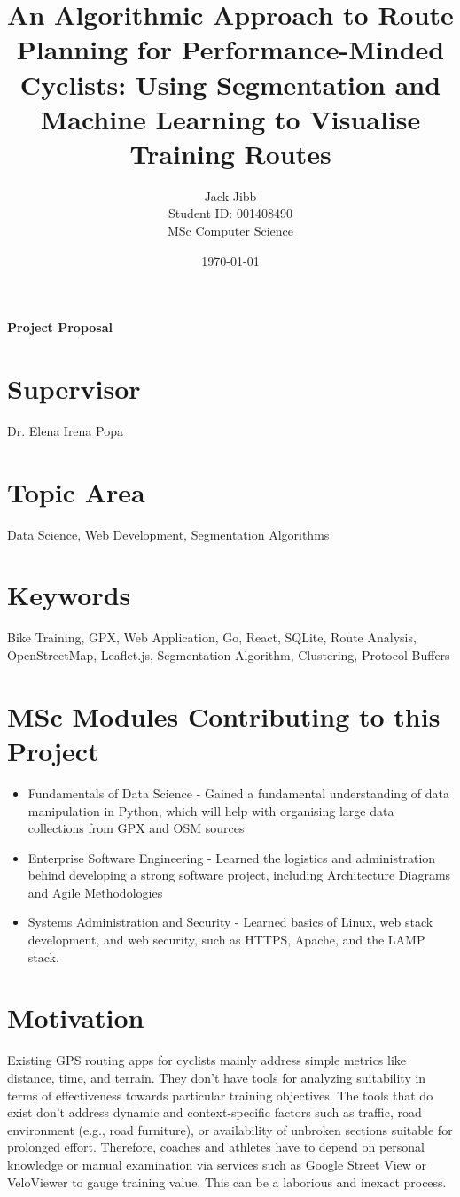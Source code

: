 \documentclass{article}
\title{An Algorithmic Approach to Route Planning for Performance-Minded Cyclists: Using Segmentation and Machine Learning to Visualise Training Routes}
\author{Jack Jibb\\ Student ID: 001408490 \\ MSc Computer Science}
\date{\today}
\begin{document}
\maketitle

\begin{center}
	\textbf{Project Proposal}
\end{center}

\section*{Supervisor}
Dr. Elena Irena Popa

\section*{Topic Area}
Data Science, Web Development, Segmentation Algorithms

\section*{Keywords}
Bike Training, GPX, Web Application, Go, React, SQLite, Route Analysis, OpenStreetMap, Leaflet.js, Segmentation Algorithm, Clustering, Protocol Buffers

\section*{MSc Modules Contributing to this Project}
\begin {itemize}
\item Fundamentals of Data Science - Gained a fundamental understanding of data manipulation in Python, which will help with organising large data collections from GPX and OSM sources
\item Enterprise Software Engineering - Learned the logistics and administration behind developing a strong software project, including Architecture Diagrams and Agile Methodologies
\item Systems Administration and Security - Learned basics of Linux, web stack development, and web security, such as HTTPS, Apache, and the LAMP stack.
\end{itemize}

\section{Motivation}
Existing GPS routing apps for cyclists mainly address simple metrics like distance, time, and terrain. They don't have tools for analyzing
suitability in terms of effectiveness towards particular training objectives. The tools that do exist don't address dynamic and context-specific factors
such as traffic, road environment (e.g., road furniture), or availability of unbroken sections suitable for prolonged effort.
Therefore, coaches and athletes have to depend on personal knowledge or manual examination via services such as Google Street View or VeloViewer to gauge
training value. This can be a laborious and inexact process.
\end{document}
